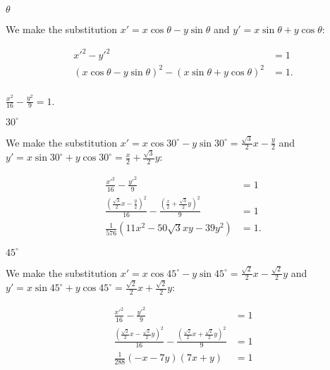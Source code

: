 \documentclass[../gatm_answers.tex]{subfiles}
\begin{document}
\begin{iinner_problem}
\item $\theta$
\end{iinner_problem}

We make the substitution $x'=x \cos \theta - y\sin \theta$ and $y'=x\sin \theta + y\cos \theta$:

\begin{align*}
x'^2-y'^2&=1 \\
(x \cos \theta - y\sin \theta)^2 - (x\sin \theta + y\cos \theta)^2 &= 1. \\
\end{align*}

\begin{inner_problem}
\item $\frac{x^2}{16}-\frac{y^2}{9}=1.$
\end{inner_problem}

\begin{iinner_problem}[start=1]
\item $30^\circ$
\end{iinner_problem}

We make the substitution $x'=x \cos 30^\circ - y\sin 30^\circ=\frac{\sqrt{3}}{2}x-\frac{y}{2}$ and $y'=x\sin 30^\circ + y\cos 30^\circ=\frac{x}{2}+\frac{\sqrt{3}}{2}y$:

\begin{align*}
\frac{x'^2}{16}-\frac{y'^2}{9} &= 1 \\
\frac{\left(\frac{\sqrt{3}}{2}x-\frac{y}{2}\right)^2}{16} - \frac{\left(\frac{x}{2}+\frac{\sqrt{3}}{2}y\right)^2}{9} &= 1 \\
\frac{1}{576} (11 x^2 - 50 \sqrt{3} x y - 39 y^2) &= 1.
\end{align*}

\begin{iinner_problem}
\item $45^\circ$
\end{iinner_problem}

We make the substitution $x'=x \cos 45^\circ - y\sin 45^\circ=\frac{\sqrt{2}}{2}x-\frac{\sqrt{2}}{2}y$ and $y'=x\sin 45^\circ + y\cos 45^\circ=\frac{\sqrt{2}}{2}x+\frac{\sqrt{2}}{2}y$:

\begin{align*}
\frac{x'^2}{16}-\frac{y'^2}{9} &= 1 \\
\frac{\left(\frac{\sqrt{2}}{2}x-\frac{\sqrt{2}}{2}y\right)^2}{16} - \frac{\left(\frac{\sqrt{2}}{2}x+\frac{\sqrt{2}}{2}y\right)^2}{9} &= 1 \\
\frac{1}{288} (-x - 7 y) (7 x + y) &= 1 \\
\end{align*}
\end{document}
